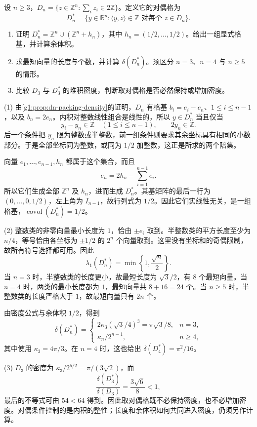 \begin{exercise}
	\label{g1:ex:dn-dual-packing}
	设 \(n\ge3\)，\(D_n=\{z\in\mathbb Z^n:\sum_i z_i\in2\mathbb Z\}\)。定义它的对偶格为
	\[
		D_n^*=\{y\in\mathbb R^n:\langle y,z\rangle\in\mathbb Z
		\text{ 对每个 }z\in D_n\}.
	\]
	\begin{enumerate}
		\item 证明 \(D_n^*=\mathbb Z^n\cup(\mathbb Z^n+h_n)\)，其中 \(h_n=(1/2,\ldots,1/2)\)。给出一组显式格基，并计算余体积。
		\item 求最短向量的长度与个数，并计算 \(\delta(D_n^*)\)。须区分 \(n=3\)、\(n=4\) 与 \(n\ge5\) 的情形。
		\item 比较 \(D_3\) 与 \(D_3^*\) 的堆积密度，判断取对偶格是否必然保持或增加密度。
	\end{enumerate}
\end{exercise}
\begin{solution}
	(1) 由\cref{g1:prop:dn-packing-density}的证明，\(D_n\) 有格基 \(b_i=e_i-e_n\)、\(1\le i\le n-1\)，以及 \(b_n=2e_n\)。内积对整数线性组合是线性的，所以 \(y\in D_n^*\) 当且仅当
	\[
		y_i-y_n\in\mathbb Z\quad(1\le i\le n-1),\qquad
		2y_n\in\mathbb Z.
	\]
	后一个条件把 \(y_n\) 限为整数或半整数，前一组条件则要求其余坐标具有相同的小数部分。于是全部坐标同为整数，或同为 \(1/2\) 加整数，这正是所求的两个陪集。

	向量 \(e_1,\ldots,e_{n-1},h_n\) 都属于这个集合，而且
	\[
		e_n=2h_n-\sum_{i=1}^{n-1}e_i.
	\]
	所以它们生成全部 \(\mathbb Z^n\) 及 \(h_n\)，进而生成 \(D_n^*\)。其基矩阵的最后一行为 \((0,\ldots,0,1/2)\)，左上角为 \(I_{n-1}\)，故行列式为 \(1/2\)。因此它们实线性无关，是一组格基，\(\operatorname{covol}(D_n^*)=1/2\)。

	(2) 整数类的非零向量最小长度为 \(1\)，恰由 \(\pm e_i\) 取到。半整数类的平方长度至少为 \(n/4\)，等号恰由各坐标为 \(\pm1/2\) 的 \(2^n\) 个向量取到。这里没有坐标和的奇偶限制，故所有符号选择都可用。因此
	\[
		\lambda_1(D_n^*)=\min\left\{1,\frac{\sqrt n}{2}\right\}.
	\]
	当 \(n=3\) 时，半整数类的长度更小，故最短长度为 \(\sqrt3/2\)，有 \(8\) 个最短向量。当 \(n=4\) 时，两类的最小长度都为 \(1\)，最短向量共 \(8+16=24\) 个。当 \(n\ge5\) 时，半整数类的长度严格大于 \(1\)，故最短向量只有 \(2n\) 个。

	由密度公式与余体积 \(1/2\)，得到
	\[
		\delta(D_n^*)=
		\begin{cases}
			2\kappa_3(\sqrt3/4)^3=\pi\sqrt3/8,&n=3,\\[2pt]
			\kappa_n/2^{n-1},&n\ge4,
		\end{cases}
	\]
	其中使用 \(\kappa_3=4\pi/3\)。在 \(n=4\) 时，这也给出 \(\delta(D_4^*)=\pi^2/16\)。

	(3) \(D_3\) 的密度为 \(\kappa_3/2^{5/2}=\pi/(3\sqrt2)\)，而
	\[
		\frac{\delta(D_3^*)}{\delta(D_3)}
		=\frac{3\sqrt6}{8}<1,
	\]
	最后的不等式可由 \(54<64\) 得到。因此取对偶格既不必保持密度，也不必增加密度。对偶条件控制的是内积的整性；长度和余体积如何共同进入密度，仍须另作计算。
\end{solution}

